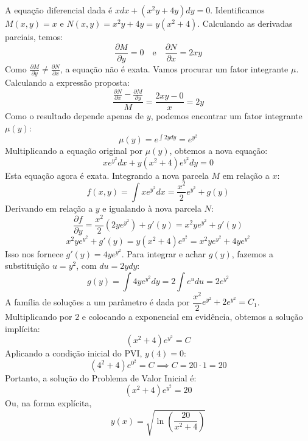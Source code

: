 \documentclass[oneside,12pt,a4paper]{report}
\begin{document}
    \begin{resolucao}
        \itemresolucao A equação diferencial dada é $xdx+(x^2y+4y)dy=0$. Identificamos $M(x,y)=x$ e $N(x,y)=x^2y+4y=y(x^2+4)$.
        Calculando as derivadas parciais, temos:
        \[\frac{\partial M}{\partial y}=0 \quad \text{e} \quad \frac{\partial N}{\partial x}=2xy\]
        Como $\frac{\partial M}{\partial y} \neq \frac{\partial N}{\partial x}$, a equação não é exata. Vamos procurar um fator integrante $\mu$. Calculando a expressão proposta:
        \[\frac{\frac{\partial N}{\partial x}-\frac{\partial M}{\partial y}}{M}=\frac{2xy-0}{x}=2y\]
        Como o resultado depende apenas de $y$, podemos encontrar um fator integrante $\mu(y)$:
        \[\mu(y)=e^{\int 2y dy}=e^{y^2}\]
        Multiplicando a equação original por $\mu(y)$, obtemos a nova equação:
        \[xe^{y^2}dx+y(x^2+4)e^{y^2}dy=0\]
        Esta equação agora é exata. Integrando a nova parcela $M$ em relação a $x$:
        \[f(x,y)=\int xe^{y^2} dx=\frac{x^2}{2}e^{y^2}+g(y)\]
        Derivando em relação a $y$ e igualando à nova parcela $N$:
        \[\frac{\partial f}{\partial y}=\frac{x^2}{2}(2ye^{y^2})+g'(y)=x^2ye^{y^2}+g'(y)\]
        \[x^2ye^{y^2}+g'(y) = y(x^2+4)e^{y^2} = x^2ye^{y^2}+4ye^{y^2}\]
        Isso nos fornece $g'(y)=4ye^{y^2}$. Para integrar e achar $g(y)$, fazemos a substituição $u=y^2$, com $du=2ydy$:
        \[g(y)=\int 4ye^{y^2}dy = 2\int e^{u}du = 2e^{y^2}\]
        A família de soluções a um parâmetro é dada por $\dfrac{x^2}{2}e^{y^2}+2e^{y^2}=C_1$.
        Multiplicando por $2$ e colocando a exponencial em evidência, obtemos a solução implícita:
        \[(x^2+4)e^{y^2}=C\]
        Aplicando a condição inicial do PVI, $y(4)=0$:
        \[(4^2+4)e^{0^2}=C \implies C=20 \cdot 1 = 20\]
        Portanto, a solução do Problema de Valor Inicial é:
        \[(x^2+4)e^{y^2}=20\]
        Ou, na forma explícita,
        \[\boxed{y(x)=\sqrt{\ln\left(\frac{20}{x^2+4}\right)}}\]


\end{resolucao}
\end{document}
